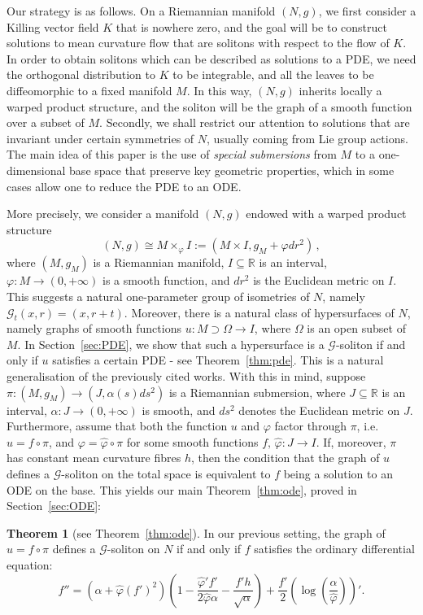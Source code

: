 \documentclass[oneside,12pt]{amsart}
\theoremstyle{definition}
\newtheorem*{theorem*}{Theorem}
\newcommand{\R}{\mathbb{R}}
\begin{document}
Our strategy is as follows. On a Riemannian manifold $(N,g)$, we first consider a Killing vector field $K$ that is nowhere zero, and the goal will be to construct solutions to mean curvature flow that are solitons with respect to the flow of $K$. In order to obtain solitons which can be described as solutions to a PDE, we need the orthogonal distribution to $K$ to be integrable, and all the leaves to be diffeomorphic to a fixed manifold $M$. In this way, $(N,g)$ inherits locally a warped product structure, and the soliton will be the graph of a smooth function over a subset of $M$. Secondly, we shall restrict our attention to solutions that are invariant under certain symmetries of $N$, usually coming from Lie group actions. The main idea of this paper is the use of \emph{special submersions} from $M$ to a one-dimensional base space that preserve key geometric properties, which in some cases allow one to reduce the PDE to an ODE.  

More precisely, we consider a manifold $(N,g)$ endowed with a warped product structure 
\[ 
(N,g) \cong M \times_{\varphi} I := \left( M \times I , g_M + \varphi dr^2 \right) \, , \] 
where $\left( M,g_M \right)$ is a Riemannian manifold, $I \subseteq \R$ is an interval, $\varphi \colon M \to (0,+\infty)$ is a smooth function, and $dr^2$ is the Euclidean metric on $I$. This suggests a natural one-parameter group of isometries of $N$, namely $\mathcal{G}_t (x,r) = (x , r+t)$. Moreover, there is a natural class of hypersurfaces of $N$, namely graphs of smooth functions $u \colon M \supset \Omega \to I$, where $\Omega$ is an open subset of $M$. In Section~\ref{sec:PDE}, we show that such a hypersurface is a $\mathcal{G}$-soliton if and only if $u$ satisfies a certain PDE - see Theorem~\ref{thm:pde}. This is a natural generalisation of the previously cited works. With this in mind, suppose  $\pi \colon \left( M,g_M \right) \to \left( J , \alpha(s) ds^2 \right)$ is a Riemannian submersion, where $J \subseteq \R$ is an interval, $\alpha \colon J \to (0,+\infty)$ is smooth, and $ds^2$ denotes the Euclidean metric on $J$. Furthermore, assume that both the function $u$ and $\varphi$ factor through $\pi$, i.e. $u = f \circ \pi$, and $\varphi=\widehat{\varphi}\circ \pi$ for some smooth functions $f,\, \widehat{\varphi}:J\rightarrow I$. If, moreover, $\pi$ has constant mean curvature fibres $h$, then the condition that the graph of $u$ defines a $\mathcal{G}$-soliton on the total space is equivalent to $f$ being a solution to an ODE on the base. This yields our main Theorem~\ref{thm:ode}, proved in Section~\ref{sec:ODE}: 
\begin{theorem*}[see Theorem~\ref{thm:ode}]
    In our previous setting, the graph of $u=f\circ \pi$ defines a $\mathcal{G}$-soliton on $N$ if and only if $f$ satisfies the ordinary differential equation:
\[ %
    f'' = \left(\alpha + \widehat{\varphi} (f')^2\right)
    \left(1 - \frac{\widehat{\varphi}' f'}{2 \widehat{\varphi} \alpha} - \frac{f' h}{\sqrt{\alpha}}\right)
    + \frac{f'}{2} \left( \log \left( \frac{\alpha}{\widehat{\varphi}} \right) \right)'.
\] 
\end{theorem*} 
\end{document}
